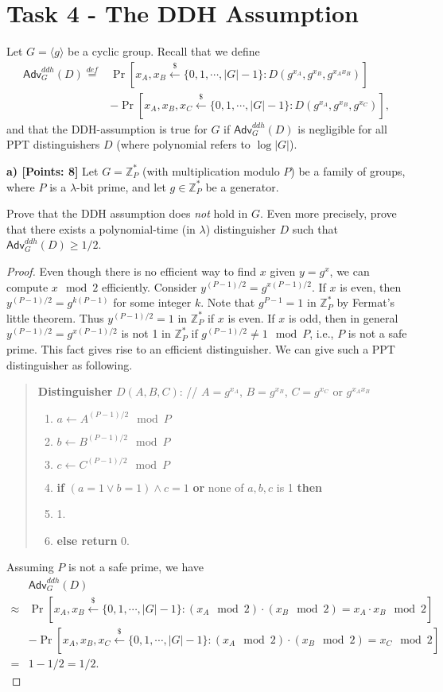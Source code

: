 \documentclass[12pt]{article}
\newcommand{\eqdef}{\stackrel{def}{=}}
\newcommand{\Z}{\mathbb{Z}}
\newcommand{\getsr}{\stackrel{\$}{\gets}}
\newcommand{\angles}[1]{\langle #1 \rangle}
\newcommand{\Adv}{\textsf{Adv}}
\newcommand{\tab}{\hspace{0.3in}}
\theoremstyle{definition}
\begin{document}
\section{Task 4 - The DDH Assumption}
Let $G = \angles{g}$ be a cyclic group. Recall that we define
$$\begin{aligned}
\Adv_G^{ddh}(D) \eqdef & \Pr[x_A, x_B \getsr \{0, 1, \cdots, |G|-1\} : D(g^{x_A}, g^{x_B}, g^{x_Ax_B})] \\
&- \Pr[x_A, x_B, x_C \getsr \{0, 1, \cdots, |G|-1\} : D(g^{x_A}, g^{x_B}, g^{x_C})],
\end{aligned}$$
and that the DDH-assumption is true for $G$ if $\Adv_G^{ddh}(D)$ is negligible for all PPT distinguishers $D$ (where polynomial refers to $\log |G|$).

{\bf a) [Points: 8]} Let $G = \Z_P^*$ (with multiplication modulo $P$) be a family of groups, where $P$ is a $\lambda$-bit prime, and let $g \in \Z_P^*$ be a generator.

Prove that the DDH assumption does \emph{not} hold in $G$. Even more precisely, prove that there exists a polynomial-time (in $\lambda$) distinguisher $D$ such that $\Adv_G^{ddh}(D) \geq 1/2$.

\begin{proof}
Even though there is no efficient way to find $x$ given $y = g^x$, we can compute $x \mod 2$ efficiently. Consider $y^{(P-1)/2} = g^{x(P-1)/2}$. If $x$ is even, then $y^{(P-1)/2} = g^{k(P-1)}$ for some integer $k$. Note that $g^{P-1}=1$ in $\Z_P^*$ by Fermat's little theorem. Thus $y^{(P-1)/2} = 1$ in $\Z_P^*$ if $x$ is even. If $x$ is odd, then in general $y^{(P-1)/2} = g^{x(P-1)/2}$ is not 1 in $\Z_P^*$ if $g^{(P-1)/2}\not=1 \mod P$, i.e., $P$ is not a safe prime.
This fact gives rise to an efficient distinguisher. 
We can give such a PPT distinguisher as following.
\begin{quote}
{\bf Distinguisher} $D (A, B, C)$: // $A = g^{x_A}$, $B = g^{x_B}$, $C = g^{x_C}$ or $g^{x_Ax_B}$
\begin{enumerate}
\item $a \gets A^{(P-1)/2} \mod P$
\item $b \gets B^{(P-1)/2} \mod P$
\item $c \gets C^{(P-1)/2} \mod P$
\item {\bf if} $(a=1 \vee b=1) \wedge c=1$ {\bf or} none of $a, b, c$ is 1 {\bf then}
\item \tab {\bf return} 1.
\item {\bf else return} 0.
\end{enumerate}
\end{quote}
Assuming $P$ is not a safe prime, we have
$$\begin{aligned}
& \Adv_{G}^{ddh}(D) \\
\approx & \Pr[x_A, x_B \getsr \{0, 1, \cdots, |G|-1\} : (x_A\mod 2)\cdot (x_B \mod 2) = x_A\cdot x_B \mod 2] \\
&- \Pr[x_A, x_B, x_C \getsr \{0, 1, \cdots, |G|-1\} : (x_A\mod 2)\cdot (x_B \mod 2) = x_C \mod 2] \\
=& 1 - 1/2 = 1/2.
\end{aligned}$$
\end{proof}
\end{document}
